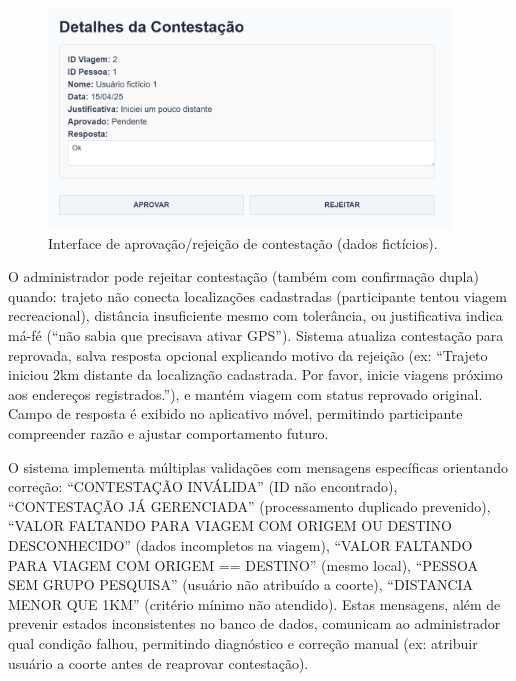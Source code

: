  
\begin{figure}[H]
    \centering
    \includegraphics[width=0.95\textwidth]{figuras/contestacao_aprovar.PNG}
    \caption{Interface de aprovação/rejeição de contestação (dados fictícios).}
    \label{fig:contestacao_aprovar}
  \end{figure}

O administrador pode rejeitar contestação (também com confirmação dupla) quando: trajeto não conecta localizações cadastradas (participante tentou viagem recreacional), distância insuficiente mesmo com tolerância, ou justificativa indica má-fé (``não sabia que precisava ativar GPS''). Sistema atualiza contestação para reprovada, salva resposta opcional explicando motivo da rejeição (ex: ``Trajeto iniciou 2km distante da localização cadastrada. Por favor, inicie viagens próximo aos endereços registrados.''), e mantém viagem com status reprovado original. Campo de resposta é exibido no aplicativo móvel, permitindo participante compreender razão e ajustar comportamento futuro.

O sistema implementa múltiplas validações com mensagens específicas orientando correção: ``CONTESTAÇÃO INVÁLIDA'' (ID não encontrado), ``CONTESTAÇÃO JÁ GERENCIADA'' (processamento duplicado prevenido), ``VALOR FALTANDO PARA VIAGEM COM ORIGEM OU DESTINO DESCONHECIDO'' (dados incompletos na viagem), ``VALOR FALTANDO PARA VIAGEM COM ORIGEM == DESTINO'' (mesmo local), ``PESSOA SEM GRUPO PESQUISA'' (usuário não atribuído a coorte), ``DISTANCIA MENOR QUE 1KM'' (critério mínimo não atendido). Estas mensagens, além de prevenir estados inconsistentes no banco de dados, comunicam ao administrador qual condição falhou, permitindo diagnóstico e correção manual (ex: atribuir usuário a coorte antes de reaprovar contestação).
